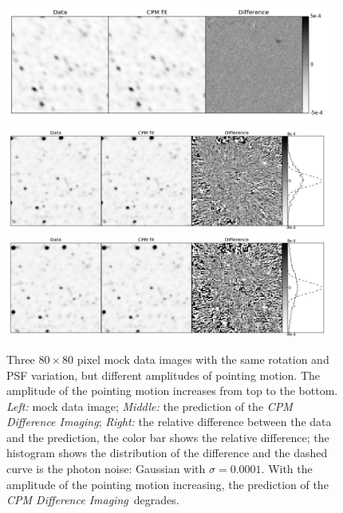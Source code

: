\documentclass[12pt, preprint]{aastex}
\newcommand{\project}[1]{\textsl{#1}}
\newcommand{\cpmdiff}{\project{CPM Difference Imaging}}
\begin{document}
\begin{figure}[p]
\begin{center}
\includegraphics[width=0.95\textwidth]{f7a}
\includegraphics[width=0.95\textwidth]{f7b}
\includegraphics[width=0.95\textwidth]{f7c}
\end{center}
\caption{
  \label{large_motion}
  Three $80\times 80$ pixel mock data images with the same rotation and PSF variation, but different amplitudes of pointing motion. The amplitude of the pointing motion increases from top to the bottom.
  \emph{Left:} mock data image;
  \emph{Middle:} the prediction of the \cpmdiff;
  \emph{Right:} the relative difference between the data and the prediction, the color bar shows the relative difference; the histogram shows the distribution of the difference and the dashed curve is the photon noise: Gaussian with $\sigma = 0.0001$. 
  With the amplitude of the pointing motion increasing, the prediction of the \cpmdiff\ degrades.
}
\end{figure}
\end{document}
